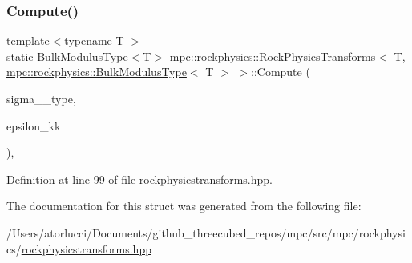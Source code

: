 \subsubsection{\texorpdfstring{Compute()}{Compute()}\hspace{0.1cm}{\footnotesize\ttfamily [8/8]}}
{\footnotesize\ttfamily template$<$typename T $>$ \\
static \mbox{\hyperlink{structmpc_1_1rockphysics_1_1_bulk_modulus_type}{Bulk\+Modulus\+Type}}$<$T$>$ \mbox{\hyperlink{structmpc_1_1rockphysics_1_1_rock_physics_transforms}{mpc\+::rockphysics\+::\+Rock\+Physics\+Transforms}}$<$ T, \mbox{\hyperlink{structmpc_1_1rockphysics_1_1_bulk_modulus_type}{mpc\+::rockphysics\+::\+Bulk\+Modulus\+Type}}$<$ T $>$ $>$\+::Compute (\begin{DoxyParamCaption}\item[{const \mbox{\hyperlink{structmpc_1_1rockphysics_1_1_hydrostatic_pressure_type}{mpc\+::rockphysics\+::\+Hydrostatic\+Pressure\+Type}}$<$ T $>$ \&}]{sigma\+\_\+\_\+type,  }\item[{const \mbox{\hyperlink{structmpc_1_1rockphysics_1_1_volumetric_strain_type}{mpc\+::rockphysics\+::\+Volumetric\+Strain\+Type}}$<$ T $>$ \&}]{epsilon\+\_\+kk }\end{DoxyParamCaption})\hspace{0.3cm}{\ttfamily [inline]}, {\ttfamily [static]}}



Definition at line 99 of file rockphysicstransforms.\+hpp.



The documentation for this struct was generated from the following file\+:\begin{DoxyCompactItemize}
\item 
/\+Users/atorlucci/\+Documents/github\+\_\+threecubed\+\_\+repos/mpc/src/mpc/rockphysics/\mbox{\hyperlink{rockphysicstransforms_8hpp}{rockphysicstransforms.\+hpp}}\end{DoxyCompactItemize}
